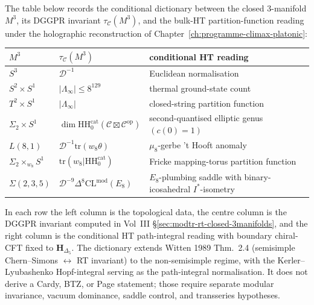 \begin{remark}
\label{rem:thqghr-holographic-dictionary}
The table below records the conditional dictionary between the
closed 3-manifold $M^3$, its DGGPR invariant $\tau_{\mathcal C}(M^3)$,
and the bulk-HT partition-function reading under the
holographic reconstruction of Chapter~\ref{ch:programme-climax-platonic}:
\begin{center}
\begin{tabular}{l|l|l}
$M^3$ & $\tau_{\mathcal C}(M^3)$ & conditional HT reading \\ \hline
$S^3$ & $\mathcal D^{-1}$ & Euclidean normalisation \\
$S^2\!\times\! S^1$ & $|\Lambda_\infty|\leq 8^{129}$ &
 thermal ground-state count \\
$T^2\!\times\! S^1$ & $|\Lambda_\infty|$ &
 closed-string partition function \\
$\Sigma_2\!\times\! S^1$ & $\dim\mathrm{HH}_0^{\mathrm{cat}}
(\mathcal C\boxtimes\mathcal C^{\mathrm{op}})$ &
 second-quantised elliptic genus $(c(0) = 1)$ \\
$L(8, 1)$ & $\mathcal D^{-1}\mathrm{tr}(w_8\theta)$ &
 $\mu_8$-gerbe 't Hooft anomaly \\
$\Sigma_2\times_{w_8}\! S^1$ & $\mathrm{tr}(w_8|\mathrm{HH}_0^{\mathrm{cat}})$ &
 Fricke mapping-torus partition function \\
$\Sigma(2, 3, 5)$ & $\mathcal D^{-9}\Delta^{8}\mathrm{CL}^{\mathrm{mod}}(E_8)$ &
 $E_8$-plumbing saddle with binary-icosahedral $I^*$-isometry \\
\end{tabular}
\end{center}
In each row the left column is the topological data, the centre column
is the DGGPR invariant computed in Vol~III \S\ref{sec:modtr-rt-closed-3manifolds},
and the right column is the conditional HT path-integral reading with
boundary chiral-CFT fixed to $\mathbf H_{\Delta_5}$. The dictionary
extends Witten 1989 Thm.~2.4 (semisimple Chern--Simons $\leftrightarrow$
RT invariant) to the non-semisimple regime, with the
Kerler--Lyubashenko Hopf-integral serving as the path-integral
normalisation. It does not derive a Cardy, BTZ, or Page statement;
those require separate modular invariance, vacuum dominance, saddle
control, and transseries hypotheses.
\end{remark}

